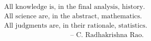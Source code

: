 \begin{align*}
&\mbox{All knowledge is, in the final analysis, history.}\\
&\mbox{All science are, in the abstract, mathematics.}\\
&\mbox{All judgments are, in their rationale, statistics. }\\
&\hspace{4cm} \mbox{-- C. Radhakrishna Rao.}
\end{align*}
